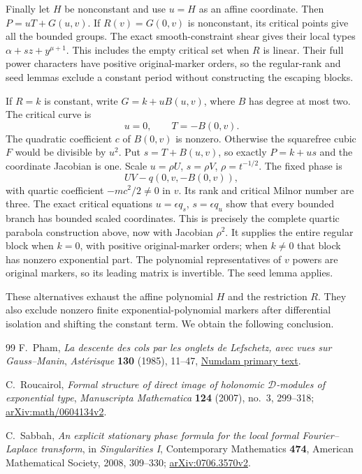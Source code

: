 \documentclass[11pt]{article}
\theoremstyle{definition}\newtheorem{definition}[theorem]{Definition}
\theoremstyle{remark}\newtheorem{remark}[theorem]{Remark}
\begin{document}
Finally let $H$ be nonconstant and use $u=H$ as an affine
coordinate. Then $P=uT+G(u,v)$. If $R(v)=G(0,v)$ is
nonconstant, its critical points give all the bounded groups.
The exact smooth-constraint shear gives their local types
$\alpha+s z+y^{\mu+1}$. This includes the empty critical set
when $R$ is linear. Their full power characters have positive
original-marker orders, so the regular-rank and seed lemmas
exclude a constant period without constructing the escaping
blocks.

If $R=k$ is constant, write $G=k+uB(u,v)$, where $B$ has
degree at most two. The critical curve is
\[
 u=0,\qquad T=-B(0,v).
\]
The quadratic coefficient $c$ of $B(0,v)$ is nonzero.
Otherwise the squarefree cubic $F$ would be divisible by $u^2$.
Put $s=T+B(u,v)$, so exactly $P=k+us$ and the coordinate
Jacobian is one. Scale $u=\rho U$, $s=\rho V$,
$\rho=t^{-1/2}$. The fixed phase is
\[
 UV-q(0,v,-B(0,v)),
\]
with quartic coefficient $-mc^2/2\ne0$ in $v$. Its rank and
critical Milnor number are three. The exact critical equations
$u=\epsilon q_s$, $s=\epsilon q_u$ show that every bounded
branch has bounded scaled coordinates. This is precisely the
complete quartic parabola construction above, now with
Jacobian $\rho^2$. It supplies the entire regular block when
$k=0$, with positive original-marker orders; when $k\ne0$
that block has nonzero exponential part. The polynomial
representatives of $v$ powers are original markers, so its
leading matrix is invertible. The seed lemma applies.

These alternatives exhaust the affine polynomial $H$ and the
restriction $R$. They also exclude nonzero finite
exponential-polynomial markers after differential isolation and
shifting the constant term. We obtain the following conclusion.


\begin{thebibliography}{99}
F.~Pham, \emph{La descente des cols par les onglets de Lefschetz,
avec vues sur Gauss--Manin}, \emph{Ast\'erisque} \textbf{130}
(1985), 11--47,
\href{https://numdam.org/item/AST_1985__130__11_0/}{Numdam primary text}.

C.~Roucairol, \emph{Formal structure of direct image of holonomic
$\mathcal D$-modules of exponential type},
\emph{Manuscripta Mathematica} \textbf{124} (2007), no.~3, 299--318;
\href{https://arxiv.org/abs/math/0604134v2}{arXiv:math/0604134v2}.

C.~Sabbah, \emph{An explicit stationary phase formula for the local
formal Fourier--Laplace transform}, in \emph{Singularities I},
Contemporary Mathematics \textbf{474}, American Mathematical Society,
2008, 309--330;
\href{https://arxiv.org/abs/0706.3570v2}{arXiv:0706.3570v2}.

\end{thebibliography}
\end{document}
